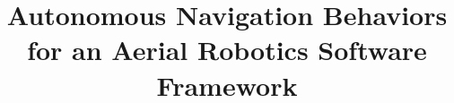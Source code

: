 \documentclass[a4paper, 11pt, oneside]{Thesis}  %
\begin{document}
  \frontmatter      %

  \title {Autonomous Navigation Behaviors for an Aerial Robotics Software Framework}
  \addresses {
    \groupname\\\deptname\\\univname
  }  %
  \date {\the\year}
  \subject {}
  \keywords {}

  \maketitle

  \fancyhead{}  %
  \rhead{\thepage}  %
  \lhead{}  %

  \pagestyle{fancy}  %


\end{document}
